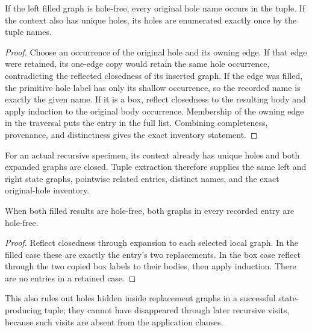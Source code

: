 \begin{theorem}
If the left filled graph is hole-free, every original hole name occurs in
the tuple. If the context also has unique holes, its holes are enumerated
exactly once by the tuple names.
\end{theorem}
\begin{proof}
Choose an occurrence of the original hole and its owning edge. If that edge
were retained, its one-edge copy would retain the same hole occurrence,
contradicting the reflected closedness of its inserted graph. If the edge was
filled, the primitive hole label has only its shallow occurrence, so the
recorded name is exactly the given name. If it is a box, reflect closedness to
the resulting body and apply induction to the original body occurrence.
Membership of the owning edge in the traversal puts the entry in the full
list. Combining completeness, provenance, and distinctness gives the exact
inventory statement.
\end{proof}
For an actual recursive specimen, its context already has unique holes and
both expanded graphs are closed. Tuple extraction therefore supplies the same
left and right state graphs, pointwise related entries, distinct names, and
the exact original-hole inventory.

\begin{lemma}
When both filled results are hole-free, both graphs in every recorded entry
are hole-free.
\end{lemma}
\begin{proof}
Reflect closedness through expansion to each selected local graph. In the
filled case these are exactly the entry's two replacements. In the box case
reflect through the two copied box labels to their bodies, then apply
induction. There are no entries in a retained case.
\end{proof}
This also rules out holes hidden inside replacement graphs in a successful
state-producing tuple; they cannot have disappeared through later recursive
visits, because such visits are absent from the application clauses.

